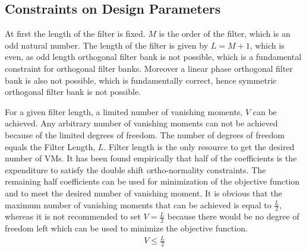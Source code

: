 \subsection{Constraints on Design Parameters}
\label{sub: Constraints on Design Parameters}
At first the length of the filter is fixed. $M$ is the order of the filter, which is an odd natural number. The length of the filter is given by $L = M +1$, which is even, as odd length orthogonal filter bank is not possible, which is a fundamental constraint for orthogonal filter banks. Moreover a linear phase orthogonal filter bank is also not possible, which is fundamentally correct, hence symmetric orthogonal filter bank is not possible.

For a given filter length, a limited number of vanishing moments, $V$ can be achieved. Any arbitrary number of vanishing moments can not be achieved because of the limited degrees of freedom. The number of degrees of freedom equals the Filter Length, $L$. Filter length is the only resource to get the desired number of VMs. It has been found empirically that half of the coefficients is the expenditure to satisfy the double shift ortho-normality constraints. The remaining half coefficients can be used for minimization of the objective function and to meet the desired number of vanishing moment. It is obvious that the maximum number of vanishing moments that can be achieved is equal to $\frac{L}{2}$, whereas it is not recommended to set $V=\frac{L}{2}$ because there would be no degree of freedom left which can be used to minimize the objective function. 
\begin{eqnarray}
\label{eq: Constraints on VM}
V \leq \frac{L}{2}
\end{eqnarray}

